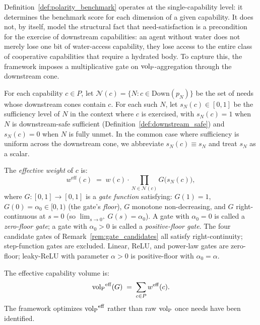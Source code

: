 Definition~\ref{def:polarity_benchmark} operates at the
single-capability level: it determines the benchmark score for
each dimension of a given capability.  It does not, by itself,
model the structural fact that need-satisfaction is a precondition
for the exercise of downstream capabilities: an agent without
water does not merely lose one bit of water-access capability,
they lose access to the entire class of cooperative capabilities
that require a hydrated body.  To capture this, the framework
imposes a multiplicative gate on ${\operatorname{vol}_{\mathrm{P}}}$-aggregation through the
downstream cone.

\begin{definition}
\label{def:downstream_gate}
For each capability $c \in P$, let $\mathcal{N}(c) = \{N : c \in
\mathrm{Down}(p_N)\}$ be the set of needs whose downstream cones
contain $c$.  For each such $N$, let $s_N(c) \in [0, 1]$ be the
sufficiency level of $N$ in the context where $c$ is exercised,
with $s_N(c) = 1$ when $N$ is downstream-safe sufficient
(Definition~\ref{def:downstream_safe}) and $s_N(c) = 0$ when $N$
is fully unmet.  In the common case where sufficiency is uniform
across the downstream cone, we abbreviate $s_N(c) \equiv s_N$ and
treat $s_N$ as a scalar.

The \emph{effective weight} of $c$ is:
\[
  w^{\mathrm{eff}}(c) \;=\; w(c) \cdot
  \prod_{N \in \mathcal{N}(c)} G\bigl(s_N(c)\bigr),
\]
where $G : [0, 1] \to [0, 1]$ is a \emph{gate function} satisfying:
$G(1) = 1$, $G(0) = \alpha_0 \in [0, 1)$ (the gate's
\emph{floor}), $G$ monotone non-decreasing, and $G$
right-continuous at $s = 0$ (so $\lim_{s \to 0^+} G(s) =
\alpha_0$).  A gate with $\alpha_0 = 0$ is called a
\emph{zero-floor gate}; a gate with $\alpha_0 > 0$ is called a
\emph{positive-floor gate}.  The four candidate gates of
Remark~\ref{rem:gate_candidates} all satisfy right-continuity;
step-function gates are excluded.  Linear, ReLU, and power-law
gates are zero-floor; leaky-ReLU with parameter $\alpha > 0$ is
positive-floor with $\alpha_0 = \alpha$.

The effective capability volume is:
\[
  {\operatorname{vol}_{\mathrm{P}}}^{\mathrm{eff}}(G) \;=\; \sum_{c \in P} w^{\mathrm{eff}}(c).
\]
The framework optimizes ${\operatorname{vol}_{\mathrm{P}}}^{\mathrm{eff}}$ rather than raw
${\operatorname{vol}_{\mathrm{P}}}$ once needs have been identified.
\end{definition}

